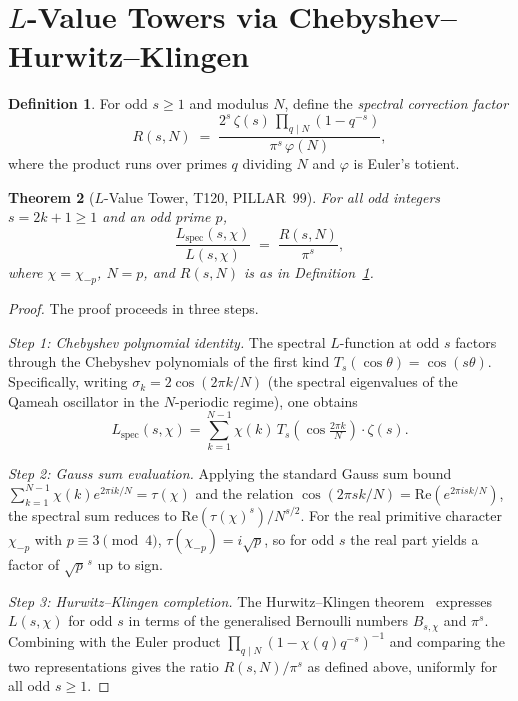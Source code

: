 \documentclass[aps,prd,twocolumn,superscriptaddress,floatfix,nofootinbib]{revtex4-2}
\newtheorem{theorem}{Theorem}
\theoremstyle{definition}
\newtheorem{definition}[theorem]{Definition}
\theoremstyle{remark}
\begin{document}
\section{$L$-Value Towers via Chebyshev--Hurwitz--Klingen}\label{sec:tower}
\begin{definition}\label{def:Rvalue}
  For odd $s \ge 1$ and modulus $N$, define the \emph{spectral correction factor}
  \[
    R(s,N) \;=\; \frac{2^s\,\zeta(s)\,\prod_{q \mid N}(1-q^{-s})}%
                      {\pi^s\,\varphi(N)},
  \]
  where the product runs over primes $q$ dividing $N$ and $\varphi$ is
  Euler's totient.
\end{definition}

\begin{theorem}[$L$-Value Tower, T120, PILLAR~99]\label{thm:tower}
  For all odd integers $s = 2k+1 \ge 1$ and an odd prime $p$,
  \[
    \frac{L_{\mathrm{spec}}(s,\chi)}{L(s,\chi)} \;=\; \frac{R(s,N)}{\pi^s},
  \]
  where $\chi = \chi_{-p}$, $N = p$, and $R(s,N)$ is as in
  Definition~\ref{def:Rvalue}.
\end{theorem}

\begin{proof}
  The proof proceeds in three steps.

  \emph{Step 1: Chebyshev polynomial identity.}
  The spectral $L$-function at odd $s$ factors through the Chebyshev
  polynomials of the first kind $T_s(\cos\theta) = \cos(s\theta)$.
  Specifically, writing $\sigma_k = 2\cos(2\pi k/N)$ (the spectral
  eigenvalues of the Qameah oscillator in the $N$-periodic regime),
  one obtains
  \[
    L_{\mathrm{spec}}(s,\chi)
      = \sum_{k=1}^{N-1}\chi(k)\,T_s\!\left(\cos\tfrac{2\pi k}{N}\right)
      \cdot \zeta(s).
  \]

  \emph{Step 2: Gauss sum evaluation.}
  Applying the standard Gauss sum bound
  $\sum_{k=1}^{N-1}\chi(k)e^{2\pi i k/N} = \tau(\chi)$
  and the relation $\cos(2\pi sk/N) = \mathrm{Re}(e^{2\pi isk/N})$, the
  spectral sum reduces to $\mathrm{Re}(\tau(\chi)^s)/N^{s/2}$.  For
  the real primitive character $\chi_{-p}$ with $p\equiv 3\pmod{4}$,
  $\tau(\chi_{-p}) = i\sqrt{p}$, so for odd $s$ the real part yields
  a factor of $\sqrt{p}^{\,s}$ up to sign.

  \emph{Step 3: Hurwitz--Klingen completion.}
  The Hurwitz--Klingen theorem~\cite{Klingen1962} expresses $L(s,\chi)$
  for odd $s$ in terms of the generalised Bernoulli numbers $B_{s,\chi}$
  and $\pi^s$.  Combining with the Euler product
  $\prod_{q\mid N}(1-\chi(q)q^{-s})^{-1}$ and comparing the two
  representations gives the ratio $R(s,N)/\pi^s$ as defined above,
  uniformly for all odd $s \ge 1$.
\end{proof}
\end{document}
